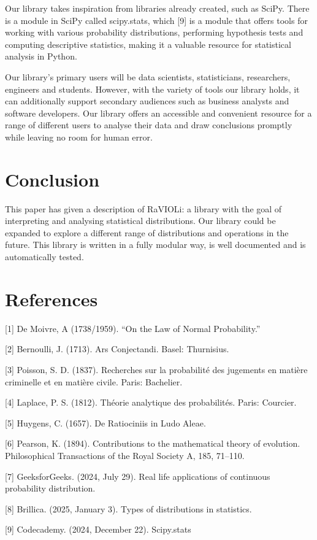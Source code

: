 \documentclass{article}
\begin{document}
Our library takes inspiration from libraries already created, such as SciPy. There is a module in SciPy called scipy.stats, which [9] is a module that offers tools for working with various probability distributions, performing hypothesis tests and computing descriptive statistics, making it a valuable resource for statistical analysis in Python.

Our library's primary users will be data scientists, statisticians, researchers, engineers and students. However, with the variety of tools our library holds, it can additionally support secondary audiences such as business analysts and software developers. Our library offers an accessible and convenient resource for a range of different users to analyse their data and draw conclusions promptly while leaving no room for human error.   

\section{Conclusion}
This paper has given a description of RaVIOLi: a library with the goal of interpreting and analysing statistical distributions. Our library could be expanded to explore a different range of distributions and operations in the future. This library is written in a fully modular way, is well documented and is automatically tested.  


\section{References}
[1] De Moivre, A (1738/1959). “On the Law of Normal Probability.” 

[2] Bernoulli, J. (1713). Ars Conjectandi. Basel: Thurnisius.

[3] Poisson, S. D. (1837). Recherches sur la probabilité des jugements en matière criminelle et en matière civile. Paris: Bachelier.

[4] Laplace, P. S. (1812). Théorie analytique des probabilités. Paris: Courcier.

[5] Huygens, C. (1657). De Ratiociniis in Ludo Aleae.

[6] Pearson, K. (1894). Contributions to the mathematical theory of evolution. Philosophical Transactions of the Royal Society A, 185, 71–110.

[7] GeeksforGeeks. (2024, July 29). Real life applications of continuous probability distribution. 

[8] Brillica. (2025, January 3). Types of distributions in statistics. 

[9] Codecademy. (2024, December 22). Scipy.stats 
\end{document}

